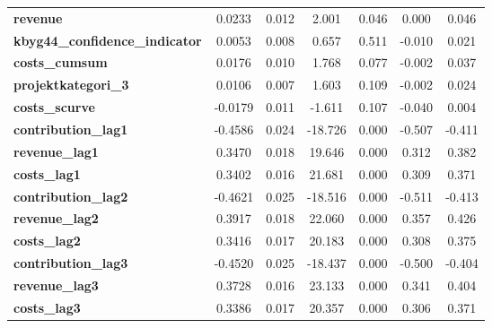 \begin{center}
\begin{tabular}{lcccccc}
\textbf{revenue}                          &       0.0233  &        0.012     &     2.001  &         0.046        &        0.000    &        0.046     \\
\textbf{kbyg44\_confidence\_indicator}    &       0.0053  &        0.008     &     0.657  &         0.511        &       -0.010    &        0.021     \\
\textbf{costs\_cumsum}                    &       0.0176  &        0.010     &     1.768  &         0.077        &       -0.002    &        0.037     \\
\textbf{projektkategori\_3}               &       0.0106  &        0.007     &     1.603  &         0.109        &       -0.002    &        0.024     \\
\textbf{costs\_scurve}                    &      -0.0179  &        0.011     &    -1.611  &         0.107        &       -0.040    &        0.004     \\
\textbf{contribution\_lag1}               &      -0.4586  &        0.024     &   -18.726  &         0.000        &       -0.507    &       -0.411     \\
\textbf{revenue\_lag1}                    &       0.3470  &        0.018     &    19.646  &         0.000        &        0.312    &        0.382     \\
\textbf{costs\_lag1}                      &       0.3402  &        0.016     &    21.681  &         0.000        &        0.309    &        0.371     \\
\textbf{contribution\_lag2}               &      -0.4621  &        0.025     &   -18.516  &         0.000        &       -0.511    &       -0.413     \\
\textbf{revenue\_lag2}                    &       0.3917  &        0.018     &    22.060  &         0.000        &        0.357    &        0.426     \\
\textbf{costs\_lag2}                      &       0.3416  &        0.017     &    20.183  &         0.000        &        0.308    &        0.375     \\
\textbf{contribution\_lag3}               &      -0.4520  &        0.025     &   -18.437  &         0.000        &       -0.500    &       -0.404     \\
\textbf{revenue\_lag3}                    &       0.3728  &        0.016     &    23.133  &         0.000        &        0.341    &        0.404     \\
\textbf{costs\_lag3}                      &       0.3386  &        0.017     &    20.357  &         0.000        &        0.306    &        0.371     \\

\end{tabular}
\end{center}
